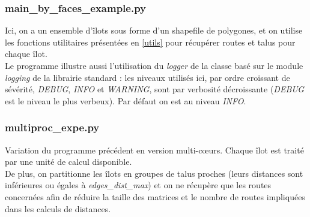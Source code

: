 \documentclass[11pt]{article}
\begin{document}
\subsubsection{main\_by\_faces\_example.py}
Ici, on a un ensemble d'îlots sous forme d'un shapefile de polygones, et on utilise les fonctions utilitaires présentées en \ref{utils} pour récupérer routes et talus pour chaque îlot.\\
Le programme illustre aussi l'utilisation du \textit{logger} de la classe basé sur le module \textit{logging} de la librairie standard : les niveaux utilisés ici, par ordre croissant de sévérité, \textit{DEBUG}, \textit{INFO} et \textit{WARNING}, sont par verbosité décroissante (\textit{DEBUG} est le niveau le plus verbeux). Par défaut on est au niveau \textit{INFO}.


\subsubsection{multiproc\_expe.py}
Variation du programme précédent en version multi-cœurs. Chaque îlot est traité par une unité de calcul disponible.\\
De plus, on partitionne les îlots en groupes de talus proches (leurs distances sont inférieures ou égales à \textit{edges\_dist\_max}) et on ne récupère que les routes concernées afin de réduire la taille des matrices et le nombre de routes impliquées dans les calculs de distances.
\end{document}

